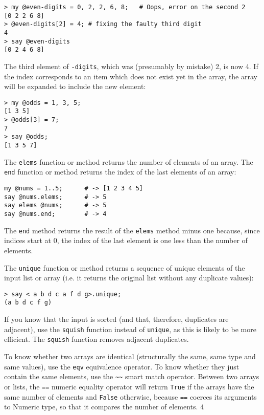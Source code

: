 \begin{verbatim}
> my @even-digits = 0, 2, 2, 6, 8;   # Oops, error on the second 2
[0 2 2 6 8]
> @even-digits[2] = 4; # fixing the faulty third digit
4
> say @even-digits
[0 2 4 6 8]
\end{verbatim}
%

The third element of {\tt \@even-digits}, which was  
(presumably by mistake) 2, is now 4. If the index corresponds 
to an item which does not exist yet in the array, the array 
will be expanded to include the new element:

\begin{verbatim}
> my @odds = 1, 3, 5;
[1 3 5]
> @odds[3] = 7;
7
> say @odds;
[1 3 5 7]
\end{verbatim}


The {\tt elems} function or method returns the number of 
elements of an array. The {\tt end} function or method 
returns the index of the last elements of an array:

\begin{verbatim}
my @nums = 1..5;      # -> [1 2 3 4 5]
say @nums.elems;      # -> 5
say elems @nums;      # -> 5
say @nums.end;        # -> 4
\end{verbatim}

The {\tt end} method returns the result of the {\tt elems} 
method minus one because, since indices start at 0, the 
index of the last element is one less than the number 
of elements.

The {\tt unique} function or method returns a sequence 
of unique elements of the input list or array (i.e. 
it returns the original list without any duplicate 
values):

\begin{verbatim}
> say < a b d c a f d g>.unique;
(a b d c f g)
\end{verbatim}

If you know that the input is sorted (and that, therefore, 
duplicates are adjacent), use the {\tt squish} function 
instead of {\tt unique}, as this is likely to be more 
efficient. The {\tt squish} function removes adjacent 
duplicates.

To know whether two arrays are identical (structurally the 
same, same type and same values), use the {\tt eqv} equivalence 
operator. To know whether they just contain the same elements, use 
the \verb'~~' smart match operator. Between two arrays or lists, the 
\verb'==' numeric equality operator will return {\tt True} if the 
arrays have the same number of elements and {\tt False} otherwise, 
because \verb'==' coerces its arguments to Numeric type, so that 
it compares the number of elements.
4


